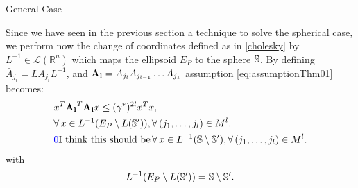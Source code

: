 \begin{subsection}{General Case}
\begin{pf}



Since we have seen in the previous section a technique to solve the spherical case, we perform now the change of coordinates defined as in \eqref{cholesky} by $L^{-1} \in \mathcal{L}(\mathbb{R}^n)$ which maps the ellipsoid $E_P$ to the sphere $\mathbb{S}$. By defining \mbox{$\bar{A}_{j_i}=  L A_{j_i} L^{-1}$,} and $\mathbf{\relax{A}_l} = \relax{A}_{j_l} \relax{A}_{j_{l-1}} \dots \relax{A}_{j_1} $ assumption \eqref{eq:assumptionThm01} becomes:
\begin{equation}\label{eq:assumption3}
\begin{aligned}
& x^T \barAl^T \barAl x \leq ({\gamma^*})^{2l} x^T x, \\
& \forall\, x \in  L^{-1}(E_P \setminus L(\sphere')), \forall\, (j_1,\dots,j_l) \in M^l. \\
& \ayca{\text{I think this should be\,} \forall\, x \in  L^{-1}(\sphere \setminus \sphere'), \forall\, (j_1,\dots,j_l) \in M^l.}
\end{aligned}
\end{equation}
with $$L^{-1}(E_P \setminus L(\mathbb{S}')) = \mathbb{S} \setminus \mathbb{S}'.$$


\end{pf}
\end{subsection}
